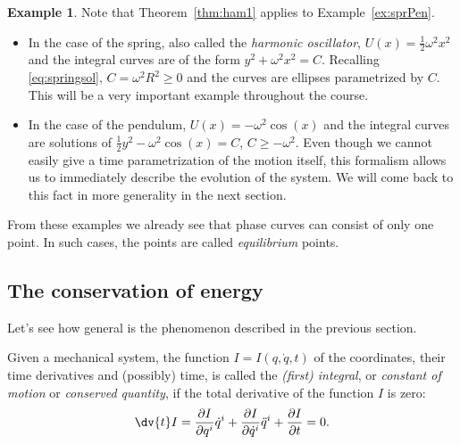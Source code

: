 \documentclass[english,fontsize=11pt,paper=b5]{scrbook}
\theoremstyle{definition}
\newtheorem{example}{Example}[chapter]
\begin{document}
    \begin{example}
      Note that Theorem~\ref{thm:ham1} applies to Example~\ref{ex:sprPen}.
      \begin{itemize}
        \item In the case of the spring, also called the \emph{harmonic oscillator}, $U(x) = \frac12 \omega^2 x^2$ and the integral curves are of the form $y^2 + \omega^2 x^2 = C$.
          Recalling \eqref{eq:springsol}, $C = \omega^2 R^2 \geq 0$ and the curves are ellipses parametrized by $C$.
          This will be a very important example throughout the course.
        \item In the case of the pendulum, $U(x) = -\omega^2 \cos(x)$ and the integral curves are solutions of $\frac12 y^2 - \omega^2 \cos(x) = C$, $C \geq -\omega^2$.
          Even though we cannot easily give a time parametrization of the motion itself, this formalism allows us to immediately describe the evolution of the system.
          We will come back to this fact in more generality in the next section.
      \end{itemize}
    \end{example}

    From these examples we already see that phase curves can consist of only one point. In such cases, the points are called \emph{equilibrium} points.

    \subsection{The conservation of energy}\label{sec:energy}

    Let's see how general is the phenomenon described in the previous section.

    \begin{tcolorbox}
      Given a mechanical system, the function $I = I(q, \dot q, t)$ of the coordinates, their time derivatives and (possibly) time, is called the \emph{(first) integral}, or \emph{constant of motion} or \emph{conserved quantity}, if the total derivative of the function $I$ is zero:
      \begin{equation}\label{eq:firstintegralD}
        \dv{t}I =
        \frac{\partial I}{\partial q^i} \dot q^i +
        \frac{\partial I}{\partial \dot q^i} \ddot q^i +
        \frac{\partial I}{\partial t}
        = 0.
      \end{equation}
    \end{tcolorbox}
\end{document}
